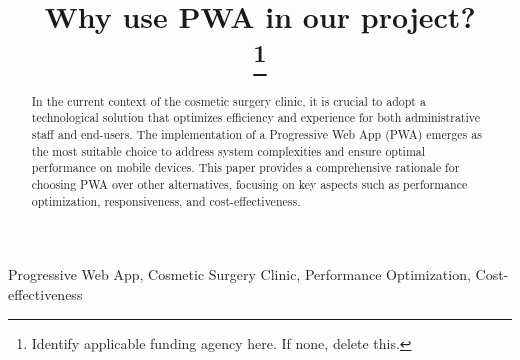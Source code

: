 \documentclass[conference]{IEEEtran}
\begin{document}
\title{Why use PWA in our project?\\
\thanks{Identify applicable funding agency here. If none, delete this.}
}

\author{
\and
{}
}



\maketitle

\begin{abstract}
In the current context of the cosmetic surgery clinic, it is crucial to adopt a technological solution that optimizes efficiency and experience for both administrative staff and end-users. The implementation of a Progressive Web App (PWA) emerges as the most suitable choice to address system complexities and ensure optimal performance on mobile devices. This paper provides a comprehensive rationale for choosing PWA over other alternatives, focusing on key aspects such as performance optimization, responsiveness, and cost-effectiveness.
\end{abstract}

\begin{IEEEkeywords}
Progressive Web App, Cosmetic Surgery Clinic, Performance Optimization, Cost-effectiveness
\end{IEEEkeywords}
\end{document}
